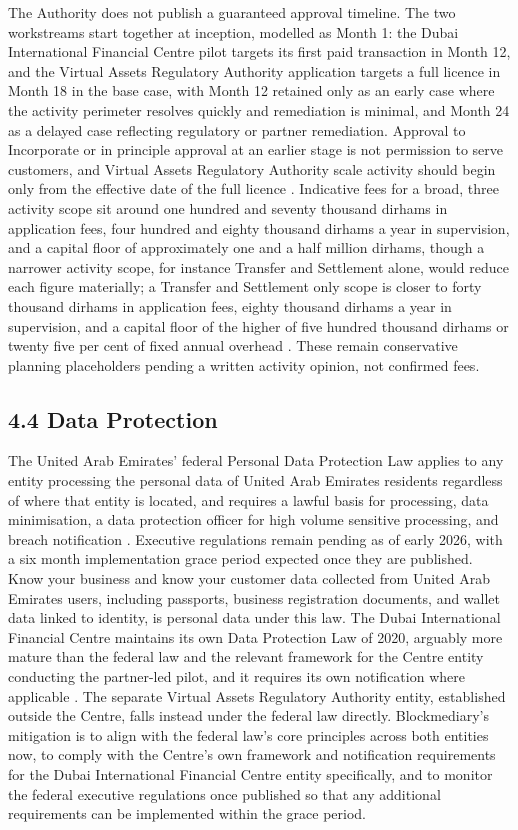 \documentclass[12pt, a4paper]{article}
\begin{document}
The Authority does not publish a guaranteed approval timeline. The two workstreams start
together at inception, modelled as Month 1: the Dubai International Financial Centre pilot
targets its first paid transaction in Month 12, and the Virtual Assets Regulatory Authority
application targets a full licence in Month 18 in the base case, with Month 12 retained
only as an early case where the activity perimeter resolves quickly and remediation is
minimal, and Month 24 as a delayed case reflecting regulatory or partner remediation.
Approval to Incorporate or in principle approval at an earlier stage is not permission to
serve customers, and Virtual Assets Regulatory Authority scale activity should begin only
from the effective date of the full licence \citep{difcvarareport2026}. Indicative fees
for a broad, three activity scope sit around one hundred and seventy thousand dirhams in
application fees, four hundred and eighty thousand dirhams a year in supervision, and a
capital floor of approximately one and a half million dirhams, though a narrower activity
scope, for instance Transfer and Settlement alone, would reduce each figure materially; a
Transfer and Settlement only scope is closer to forty thousand dirhams in application
fees, eighty thousand dirhams a year in supervision, and a capital floor of the higher of
five hundred thousand dirhams or twenty five per cent of fixed annual overhead
\citep{vararulebook2025fees}. These remain conservative planning placeholders pending a
written activity opinion, not confirmed fees.

\subsection*{4.4 Data Protection}

The United Arab Emirates' federal Personal Data Protection Law applies to any entity
processing the personal data of United Arab Emirates residents regardless of where that
entity is located, and requires a lawful basis for processing, data minimisation, a data
protection officer for high volume sensitive processing, and breach notification
\citep{pdpl2021}. Executive regulations remain pending as of early 2026, with a six month
implementation grace period expected once they are published. Know your business and know
your customer data collected from United Arab Emirates users, including passports,
business registration documents, and wallet data linked to identity, is personal data
under this law. The Dubai International Financial Centre maintains its own Data
Protection Law of 2020, arguably more mature than the federal law and the relevant
framework for the Centre entity conducting the partner-led pilot, and it requires its own
notification where applicable \citep{difcdplaw2020}. The separate Virtual Assets
Regulatory Authority entity, established outside the Centre, falls instead under the
federal law directly. Blockmediary's mitigation is to align with the federal law's core
principles across both entities now, to comply with the Centre's own framework and
notification requirements for the Dubai International Financial Centre entity
specifically, and to monitor the federal executive regulations once published so that any
additional requirements can be implemented within the grace period.
\end{document}

